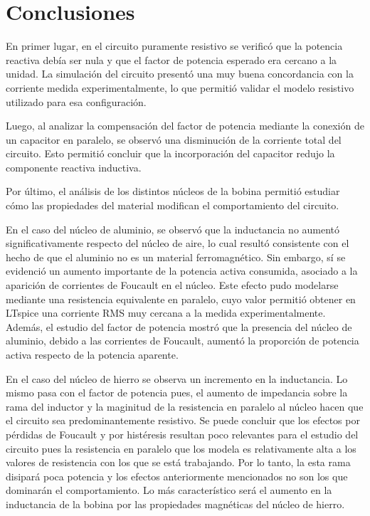 
\section{Conclusiones}

En primer lugar, en el circuito puramente resistivo se verificó que la potencia reactiva debía ser nula y que el factor de potencia esperado era cercano a la unidad. La simulación del circuito presentó una muy buena concordancia con la corriente medida experimentalmente, lo que permitió validar el modelo resistivo utilizado para esa configuración.

Luego, al analizar la compensación del factor de potencia mediante la conexión de un capacitor en paralelo, se observó una disminución de la corriente total del circuito. Esto permitió concluir que la incorporación del capacitor redujo la componente reactiva inductiva.

Por último, el análisis de los distintos núcleos de la bobina permitió estudiar cómo las propiedades del material modifican el comportamiento del circuito. 

En el caso del núcleo de aluminio, se observó que la inductancia no aumentó significativamente respecto del núcleo de aire, lo cual resultó consistente con el hecho de que el aluminio no es un material ferromagnético. Sin embargo, sí se evidenció un aumento importante de la potencia activa consumida, asociado a la aparición de corrientes de Foucault en el núcleo. Este efecto pudo modelarse mediante una resistencia equivalente en paralelo, cuyo valor permitió obtener en LTspice una corriente RMS muy cercana a la medida experimentalmente. Además, el estudio del factor de potencia mostró que la presencia del núcleo de aluminio, debido a las corrientes de Foucault, aumentó la proporción de potencia activa respecto de la potencia aparente.

En el caso del núcleo de hierro se observa un incremento en la inductancia. Lo mismo pasa con el factor de potencia pues, el aumento de impedancia sobre la rama del inductor y la maginitud de la resistencia en paralelo al núcleo hacen que el circuito sea predominantemente resistivo. Se puede concluir que los efectos por pérdidas de Foucault y por histéresis resultan poco relevantes para el estudio del circuito pues la resistencia en paralelo que los modela es relativamente alta a los valores de resistencia con los que se está trabajando. Por lo tanto, la esta rama disipará poca potencia y los efectos anteriormente mencionados no son los que dominarán el comportamiento. Lo más característico será el aumento en la inductancia de la bobina por las propiedades magnéticas del núcleo de hierro. 


